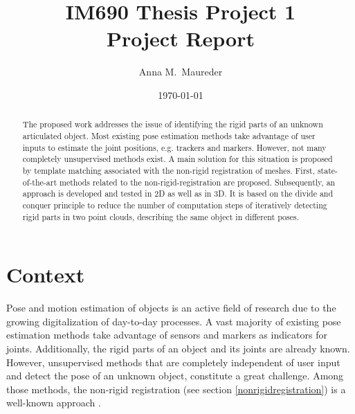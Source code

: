 \documentclass[notitlepage,english]{hgbreport}
\author{Anna M.\ Maureder}
\title{IM690 Thesis Project 1\\ %
	Project Report}	%
\date{\today}
\begin{document}
	
	\maketitle
	
	\begin{abstract}\noindent
		The proposed work addresses the issue of identifying the rigid parts of an unknown articulated object. Most existing pose estimation methods take advantage of user inputs to estimate the joint positions, e.g. trackers and markers. However, not many completely unsupervised methods exist. A main solution for this situation is proposed by template matching associated with the non-rigid registration of meshes. First, state-of-the-art methods related to the non-rigid-registration are proposed.  Subsequently, an approach is developed and tested in 2D as well as in 3D. It is based on the divide and conquer principle to reduce the number of computation steps of iteratively detecting rigid parts in two point clouds, describing the same object in different poses.
	\end{abstract}
	
	
	\tableofcontents

	\chapter{Context}
	
	Pose and motion estimation of objects is an active field of research due to the growing digitalization of day-to-day processes. A vast majority of existing pose estimation methods take advantage of sensors and markers as indicators for joints. Additionally, the rigid parts of an object and its joints are already known. However, unsupervised methods that are completely independent of user input and detect the pose of an unknown object, constitute a great challenge. Among those methods, the non-rigid registration (see section \ref{nonrigidregistration}) is a well-known approach \cite{survey}.
\end{document}
